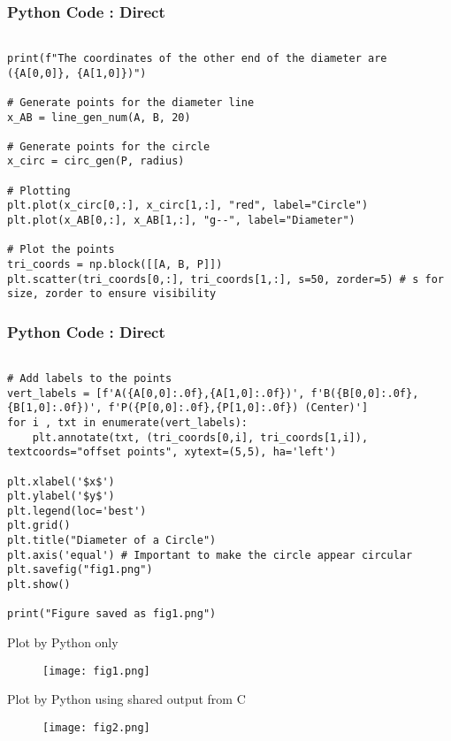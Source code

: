 \documentclass{beamer}
\begin{document}
\begin{frame}[fragile]
\frametitle{Python Code : Direct }

\begin{lstlisting}

print(f"The coordinates of the other end of the diameter are ({A[0,0]}, {A[1,0]})")

# Generate points for the diameter line
x_AB = line_gen_num(A, B, 20)

# Generate points for the circle
x_circ = circ_gen(P, radius)

# Plotting
plt.plot(x_circ[0,:], x_circ[1,:], "red", label="Circle")
plt.plot(x_AB[0,:], x_AB[1,:], "g--", label="Diameter")

# Plot the points
tri_coords = np.block([[A, B, P]])
plt.scatter(tri_coords[0,:], tri_coords[1,:], s=50, zorder=5) # s for size, zorder to ensure visibility
\end{lstlisting}
\end{frame}
\begin{frame}[fragile]
\frametitle{Python Code : Direct }

\begin{lstlisting}

# Add labels to the points
vert_labels = [f'A({A[0,0]:.0f},{A[1,0]:.0f})', f'B({B[0,0]:.0f},{B[1,0]:.0f})', f'P({P[0,0]:.0f},{P[1,0]:.0f}) (Center)']
for i , txt in enumerate(vert_labels):
    plt.annotate(txt, (tri_coords[0,i], tri_coords[1,i]), textcoords="offset points", xytext=(5,5), ha='left')

plt.xlabel('$x$')
plt.ylabel('$y$')
plt.legend(loc='best')
plt.grid()
plt.title("Diameter of a Circle")
plt.axis('equal') # Important to make the circle appear circular
plt.savefig("fig1.png")
plt.show()

print("Figure saved as fig1.png")

\end{lstlisting}

\end{frame}

\begin{frame}{Plot by Python only}
\begin{figure}[H]
        \centering
        \texttt{[image: fig1.png]}
        \caption{}
        \label{fig:1}
    \end{figure}
\end{frame}


\begin{frame}{Plot by Python using shared output from C}
\begin{figure}[H]
        \centering
        \texttt{[image: fig2.png]}
        \caption{}
        \label{fig:2}
    \end{figure}
\end{frame}
 
\end{document}
